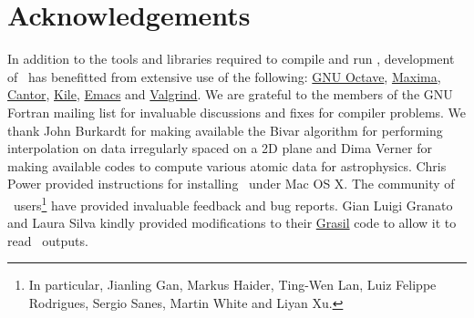 \chapter{Acknowledgements}

In addition to the tools and libraries required to compile and run \glc, development of \glc\ has benefitted from extensive use of the following: \href{http://www.gnu.org/software/octave/}{{\sc GNU Octave}}, \href{http://maxima.sourceforge.net/}{{\sc Maxima}}, \href{http://edu.kde.org/cantor/}{{\sc Cantor}}, \href{http://kile.sourceforge.net/}{{\sc Kile}}, \href{http://www.gnu.org/software/emacs/}{{\sc Emacs}} and \href{http://valgrind.org/}{{\sc Valgrind}}. We are grateful to the members of the {\sc GNU Fortran} mailing list for invaluable discussions and fixes for compiler problems. We thank John Burkardt for making available the {\sc Bivar} algorithm for performing interpolation on data irregularly spaced on a 2D plane and Dima Verner for making available codes to compute various atomic data for astrophysics. Chris Power provided instructions for installing \glc\ under Mac OS X. The community of \glc\ users\footnote{In particular, Jianling Gan, Markus Haider, Ting-Wen Lan, Luiz Felippe Rodrigues, Sergio Sanes, Martin White and Liyan Xu.} have provided invaluable feedback and bug reports. Gian Luigi Granato and Laura Silva kindly provided modifications to their \href{http://adlibitum.oat.ts.astro.it/silva/grasil/grasil.html}{\sc Grasil} code to allow it to read \glc\ outputs.
